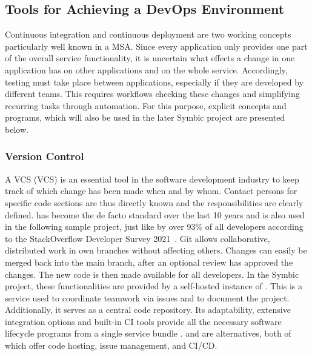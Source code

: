     \subsection{Tools for Achieving a DevOps Environment}\label{ssec::getting_devops}
    Continuous integration and continuous deployment are two working concepts particularly well known in a \ac{MSA}. Since every application only provides one part of the overall service functionality, it is uncertain what effects a change in one application has on other applications and on the whole service. Accordingly, testing must take place between applications, especially if they are developed by different teams. This requires workflows checking these changes and simplifying recurring tasks through automation. For this purpose, explicit concepts and programs, which will also be used in the later Symbic project are presented below.

        \subsubsection{Version Control}
        A \acl{VCS} (\ac{VCS}) is an essential tool in the software development industry to keep track of which change has been made when and by whom. Contact persons for specific code sections are thus directly known and the responsibilities are clearly defined.  has become the de facto standard over the last 10 years and is also used in the following sample project, just like by over 93\% of all developers according to the StackOverflow Developer Survey 2021~\cite{stackoverflow2018}. Git allows collaborative, distributed work in own branches without affecting others. Changes can easily be merged back into the main branch, after an optional review has approved the changes. The new code is then made available for all developers. In the Symbic project, these functionalities are provided by a self-hosted instance of . This is a service used to coordinate teamwork via issues and to document the project. Additionally, it serves as a central code repository. Its adaptability, extensive integration options and built-in \acs{CI} tools provide all the necessary software lifecycle programs from a single service bundle \cite{gitlabdocs}.  and  are alternatives, both of which offer code hosting, issue management, and \ac{CI}/\ac{CD}.

